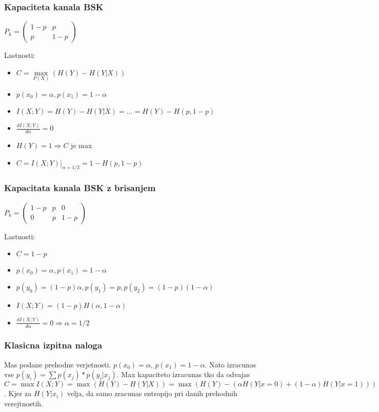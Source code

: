 \documentclass{article}
\begin{document}
\begin{multicols}{4}
	\subsubsection{Kapaciteta kanala BSK}
	\begin{center}
		\begin{math}
			P_k =
			\begin{pmatrix}
				1-p & p   \\
				p   & 1-p
			\end{pmatrix}
		\end{math}
	\end{center}
	Lastnosti:
	\begin{itemize}
		\item $C =\underset{P(X)}{\max} (H(Y) - H(Y|X))$
		\item $p(x_0) = \alpha, p(x_1) = 1 - \alpha$
		\item $I(X;Y) = H(Y) - H(Y|X) = \dots = H(Y) - H(p, 1-p)$
		\item $\frac{dI(X;Y)}{d \alpha} = 0$
		\item $H(Y) = 1 \Rightarrow C$ je max
		\item $C=I(X;Y) |_{\alpha = 1/2} = 1 - H(p, 1-p)$
	\end{itemize}
	\subsubsection{Kapacitata kanala BSK z brisanjem}
	\begin{center}
		\begin{math}
			P_k =
			\begin{pmatrix}
				1-p & p & 0   \\
				0   & p & 1-p
			\end{pmatrix}
		\end{math}
	\end{center}
	Lastnosti:
	\begin{itemize}
		\item $C = 1 - p$
		\item $p(x_0) = \alpha, p(x_1) = 1 - \alpha$
		\item $p(y_0) = (1-p)\alpha, p(y_1) = p, p(y_2) = (1-p)(1-\alpha)$
		\item $I(X;Y) = (1-p)H(\alpha, 1 - \alpha)$
		\item $\frac{dI(X;Y)}{d \alpha} = 0 \Rightarrow \alpha = 1/2$
	\end{itemize}

	\subsubsection{Klasicna izpitna naloga}
	Mas podane prehodne verjetnosti. $p(x_0) = \alpha$, $p(x_1) = 1 - \alpha$. Nato izracunas
	vse $p(y_i) = \sum p(x_j) * p(y_i | x_j)$. Max kapaciteto izracunas tko da odvajas
	$C = \max I (X;Y) = \max (H(Y) - H(Y|X)) = \max (H(Y) - (\alpha H(Y | x = 0) + (1 - \alpha) H(Y | x = 1)))$. Kjer za $H(Y | x_i)$ velja, da samo
	zracunas entropijo pri danih prehodnih verejtnostih.


\end{multicols}
\end{document}
